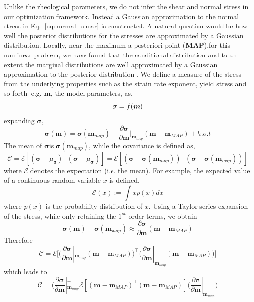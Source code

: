 \documentclass[12pt]{article}
\newcommand{\mm}{{\ensuremath{\boldsymbol{m}}}}
\newcommand{\ssigma}{{\ensuremath{\boldsymbol{\sigma}}}}
\begin{document}
{Unlike the rheological parameters, we do not infer the shear and normal stress in our optimization framework. Instead a Gaussian approximation to the normal stress in Eq.~\eqref{eq:normal_shear} is constructed. A natural question would be how well the posterior distributions for the stresses are approximated by a Gaussian distribution. Locally, near the maximum a posteriori point (\textbf{MAP}),for this nonlinear problem, we have found that the conditional distribution and to an extent the marginal distributions are well approximated by a Gaussian approximation to the posterior distribution \citep{ratnaswamy2015adjoint}.  We define a measure of the stress from the underlying properties such as the strain rate exponent, yield stress and so forth, e.g. $\mm$, the model parameters, as, 
\begin{equation}
\textit \ssigma = f(\mm)
\end{equation}
expanding $\ssigma$,
\begin{equation}
\ssigma (\mm) = \ssigma(\mm_{map}) + \frac{\partial\ssigma}{\partial \mm}|_{\mm_{map}} (\mm-\mm_{MAP}) + h.o.t
\end{equation}
The mean of \ssigma is $\ssigma(\mm_{map})$, while the covariance is defined as,
\begin{equation}
\mathcal C = \mathcal E[(\ssigma-\mu_{\ssigma})^\intercal(\ssigma-\mu_{\ssigma})]  = \mathcal E[(\ssigma-\ssigma(\mm_{map}))^\intercal(\ssigma-\ssigma(\mm_{map}))]
\end{equation}
where $\mathcal E$ denotes the expectation (i.e. the mean). For example, the expected value of a continuous random variable $x$ is defined,
\begin{equation}
\mathcal E(x):= \int x p(x) dx
\end{equation}
where $p(x)$ is the probability distribution of $x$.
Using a Taylor series expansion of the  stress, while only retaining the $1^{st}$ order terms, we obtain
\begin{equation}
\ssigma (\mm) -\ssigma(\mm_{map}) \approx \frac{\partial\ssigma}{\partial \mm} (\mm-\mm_{MAP})
\end{equation}
Therefore
\begin{equation}
\mathcal C = \mathcal E\big[\big(\frac{\partial\ssigma}{\partial \mm}|_{\mm_{map}} (\mm-\mm_{MAP})\big)^\intercal\big(\frac{\partial\ssigma}{\partial \mm}|_{\mm_{map}} (\mm-\mm_{MAP})\big)\big]
\end{equation}
which leads to
\begin{equation}
\mathcal C = \big(\frac{\partial\ssigma}{\partial \mm}|_{\mm_{map}}^\intercal \mathcal E[(\mm-\mm_{MAP})^\intercal(\mm-\mm_{MAP})](\frac{\partial\ssigma}{\partial \mm}|_{\mm_{map}}\big)

\end{equation}}
\end{document}
